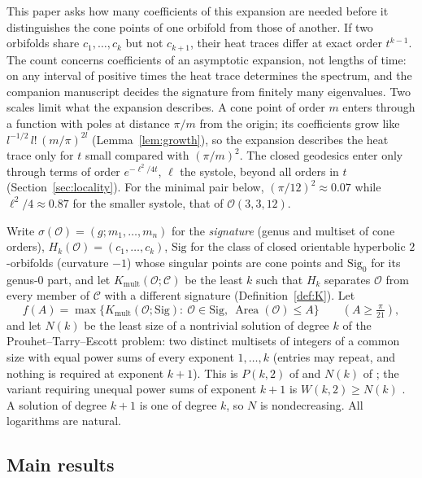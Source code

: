 \documentclass[pdflatex,sn-mathphys-num]{sn-jnl}
\theoremstyle{thmstyleone}%
\theoremstyle{thmstylethree}%
\newcommand{\Orb}{\mathcal{O}}
\newcommand{\Cl}{\mathcal{C}}
\newcommand{\Sig}{\mathrm{Sig}}
\newcommand{\Kmult}{K_{\mathrm{mult}}}
\newcommand{\Area}{\operatorname{Area}}
\begin{document}
This paper asks how many coefficients of this expansion are needed before it distinguishes the cone points of one orbifold from those of another. If two orbifolds share $c_1,\dots,c_k$ but not $c_{k+1}$, their heat traces differ at exact order $t^{k-1}$. The count concerns coefficients of an asymptotic expansion, not lengths of time: on any interval of positive times the heat trace determines the spectrum, and the companion manuscript \cite{companionB} decides the signature from finitely many eigenvalues. Two scales limit what the expansion describes. A cone point of order $m$ enters through a function with poles at distance $\pi/m$ from the origin; its coefficients grow like $l^{-1/2}\,l!\,(m/\pi)^{2l}$ (Lemma~\ref{lem:growth}), so the expansion describes the heat trace only for $t$ small compared with $(\pi/m)^2$. The closed geodesics enter only through terms of order $e^{-\ell^2/4t}$, $\ell$ the systole, beyond all orders in $t$ (Section~\ref{sec:locality}). For the minimal pair below, $(\pi/12)^2\approx0.07$ while $\ell^2/4\approx0.87$ for the smaller systole, that of $\Orb(3,3,12)$.

Write $\sigma(\Orb)=(g;m_1,\dots,m_n)$ for the \emph{signature} (genus and multiset of cone orders), $H_k(\Orb)=(c_1,\dots,c_k)$, $\Sig$ for the class of closed orientable hyperbolic $2$-orbifolds (curvature $-1$) whose singular points are cone points and $\Sig_0$ for its genus-$0$ part, and let $\Kmult(\Orb;\Cl)$ be the least $k$ such that $H_k$ separates $\Orb$ from every member of $\Cl$ with a different signature (Definition~\ref{def:K}). Let
\[
  f(A)=\max\{\Kmult(\Orb;\Sig):\ \Orb\in\Sig,\ \Area(\Orb)\le A\}\qquad(A\ge\tfrac\pi{21}),
\]
and let $N(k)$ be the least size of a nontrivial solution of degree $k$ of the Prouhet--Tarry--Escott problem: two distinct multisets of integers of a common size with equal power sums of every exponent $1,\dots,k$ (entries may repeat, and nothing is required at exponent $k+1$). This is $P(k,2)$ of \cite[\S1]{crootmaoyip2026} and $N(k)$ of \cite[p.~6]{borweiningalls1994}; the variant requiring unequal power sums of exponent $k+1$ is $W(k,2)\ge N(k)$ \cite[\S1]{crootmaoyip2026}. A solution of degree $k+1$ is one of degree $k$, so $N$ is nondecreasing. All logarithms are natural.

\subsection{Main results}\label{sec:main}
\end{document}
